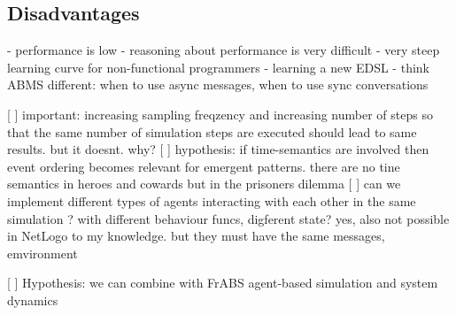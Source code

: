 \subsection{Disadvantages}
	- performance is low
	- reasoning about performance is very difficult
	- very steep learning curve for non-functional programmers
	- learning a new EDSL
	- think ABMS different: when to use async messages, when to use sync conversations


[ ] important: increasing sampling freqzency and increasing number of steps so that the same number of simulation steps are executed should lead to same results. but it doesnt. why?
[ ] hypothesis: if time-semantics are involved then event ordering becomes relevant for emergent patterns. there are no tine semantics in heroes and cowards but in the prisoners dilemma
[ ] can we implement different types of agents interacting with each other in the same simulation ? with different behaviour funcs, digferent state? yes, also not possible in NetLogo to my knowledge. but they must have the same messages, emvironment 

[ ] Hypothesis: we can combine with FrABS agent-based simulation and system dynamics